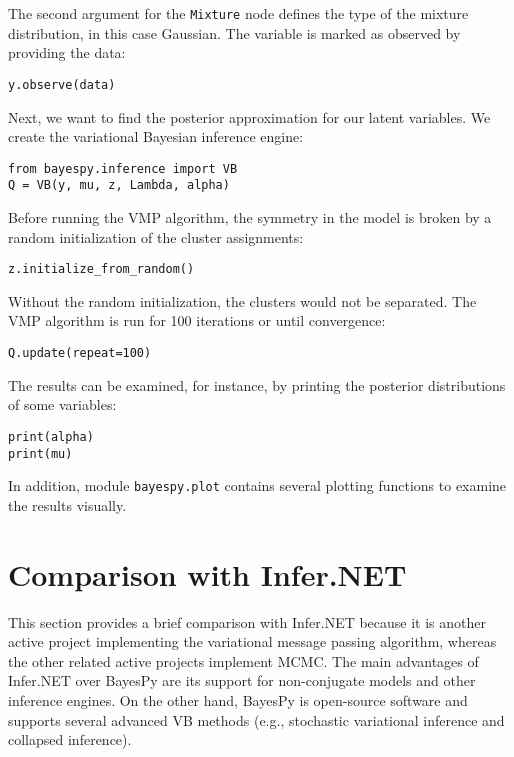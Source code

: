 \documentclass[twoside,11pt]{article}
\begin{document}
The second argument for the \texttt{Mixture} node defines the type of the
mixture distribution, in this case Gaussian.  The variable is marked as observed
by providing the data:
\begin{lstlisting}
y.observe(data)
\end{lstlisting}
Next, we want to find the posterior approximation for our latent variables.  We
create the variational Bayesian inference engine:
\begin{lstlisting}
from bayespy.inference import VB
Q = VB(y, mu, z, Lambda, alpha)
\end{lstlisting}
Before running the VMP algorithm, the symmetry in the model is broken by
a random initialization of the cluster assignments:
\begin{lstlisting}
z.initialize_from_random()
\end{lstlisting}
Without the random initialization, the clusters would not be separated.  The VMP
algorithm is run for 100 iterations or until convergence:
\begin{lstlisting}
Q.update(repeat=100)
\end{lstlisting}
The results can be examined, for instance, by printing the posterior
distributions of some variables:
\begin{lstlisting}
print(alpha)
print(mu)
\end{lstlisting}
In addition, module \texttt{bayespy.plot} contains several plotting functions to
examine the results visually.


\section{Comparison with Infer.NET}


This section provides a brief comparison with Infer.NET because it is another
active project implementing the variational message passing algorithm, whereas
the other related active projects implement MCMC.  The main advantages of
Infer.NET over BayesPy are its support for non-conjugate models and other
inference engines.  On the other hand, BayesPy is open-source software and
supports several advanced VB methods (e.g., stochastic variational inference and
collapsed inference).
\end{document}
